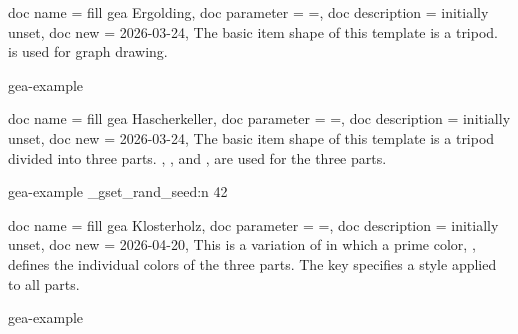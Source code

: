 \documentclass[a4paper,11pt]{article}
\begin{document}
\clearpage
\begin{docTikzKeys}
  {
    {
      doc name        = fill gea Ergolding,
      doc parameter   = {=},
      doc description = {initially unset},
      doc new         = 2026-03-24,
    }
  }
  The basic item shape of this template is a tripod.
   is used for graph drawing.

\begin{dispExample*}{gea-example}
\end{dispExample*}
\end{docTikzKeys}


\begin{docTikzKeys}
  {
    {
      doc name        = fill gea Hascherkeller,
      doc parameter   = {=},
      doc description = {initially unset},
      doc new         = 2026-03-24,
    }
  }
  The basic item shape of this template is a tripod divided into three parts.
  ,
  , and
  , are used for the three parts.
\begin{dispExample*}{gea-example}
\ExplSyntaxOn
\sys_gset_rand_seed:n {42}
\ExplSyntaxOff
{}
\end{dispExample*}
\end{docTikzKeys}


\begin{docTikzKeys}
  {
    {
      doc name        = fill gea Klosterholz,
      doc parameter   = {=},
      doc description = {initially unset},
      doc new         = 2026-04-20,
    }
  }
  This is a variation of  in which a
  prime color, , defines
  the individual colors of the three parts. The key 
  specifies a style applied to all parts.
\begin{dispExample*}{gea-example}
\end{dispExample*}
\end{docTikzKeys}
\end{document}
